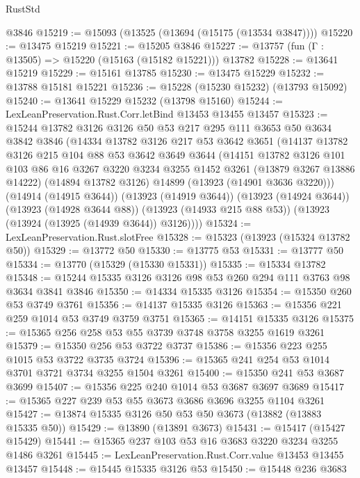 \begin{lexlean}{RustStd}
\begin{coremodule}
    @3846
@15219 := @15093 (@13525 (@13694 (@15175 (@13534 @3847))))
@15220 := @13475 @15219
@15221 := @15205 @3846
@15227 := @13757 (fun (Γ : @13505) => @15220 (@15163 (@15182 @15221))) @13782
@15228 := @13641 @15219
@15229 := @15161 @13785
@15230 := @13475 @15229
@15232 := @13788 @15181 @15221
@15236 := @15228 (@15230 @15232) (@13793 @15092)
@15240 := @13641 @15229 @15232 (@13798 @15160)
@15244 := LexLeanPreservation.Rust.Corr.letBind @13453 @13455 @13457
@15323 := @15244
    @13782
    @3126
    @3126
    @50
    @53
    @217
    @295
    @111
    @3653
    @50
    @3634
    @3842
    @3846
    (@14334
      @13782
      @3126
      @217
      @53
      @3642
      @3651
      (@14137
        @13782
        @3126
        @215
        @104
        @88
        @53
        @3642
        @3649
        @3644
        (@14151
          @13782
          @3126
          @101
          @103
          @86
          @16
          @3267
          @3220
          @3234
          @3255
          @1452
          @3261
          (@13879 @3267 @13886 @14222)
          (@14894 @13782 @3126)
          @14899
          (@13923 (@14901 @3636 @3220)))
        (@14914 (@14915 @3644))
        (@13923 (@14919 @3644))
        (@13923 (@14924 @3644))
        (@13923 (@14928 @3644 @88))
        (@13923 (@14933 @215 @88 @53))
        (@13923 (@13924 (@13925 (@14939 @3644)) @3126))))
@15324 := LexLeanPreservation.Rust.slotFree
@15328 := @15323 (@13923 (@15324 @13782 @50))
@15329 := @13772 @50
@15330 := @13775 @53
@15331 := @13777 @50
@15334 := @13770 (@15329 (@15330 @15331))
@15335 := @15334 @13782
@15348 := @15244 @15335 @3126 @3126 @98 @53 @260 @294 @111 @3763 @98 @3634 @3841 @3846
@15350 := @14334 @15335 @3126
@15354 := @15350 @260 @53 @3749 @3761
@15356 := @14137 @15335 @3126
@15363 := @15356 @221 @259 @1014 @53 @3749 @3759 @3751
@15365 := @14151 @15335 @3126
@15375 := @15365 @256 @258 @53 @55 @3739 @3748 @3758 @3255 @1619 @3261
@15379 := @15350 @256 @53 @3722 @3737
@15386 := @15356 @223 @255 @1015 @53 @3722 @3735 @3724
@15396 := @15365 @241 @254 @53 @1014 @3701 @3721 @3734 @3255 @1504 @3261
@15400 := @15350 @241 @53 @3687 @3699
@15407 := @15356 @225 @240 @1014 @53 @3687 @3697 @3689
@15417 := @15365 @227 @239 @53 @55 @3673 @3686 @3696 @3255 @1104 @3261
@15427 := @13874 @15335 @3126 @50 @53 @50 @3673 (@13882 (@13883 @15335 @50))
@15429 := @13890 (@13891 @3673)
@15431 := @15417 (@15427 @15429)
@15441 := @15365 @237 @103 @53 @16 @3683 @3220 @3234 @3255 @1486 @3261
@15445 := LexLeanPreservation.Rust.Corr.value @13453 @13455 @13457
@15448 := @15445 @15335 @3126 @53
@15450 := @15448 @236 @3683

\end{coremodule}
\end{lexlean}
